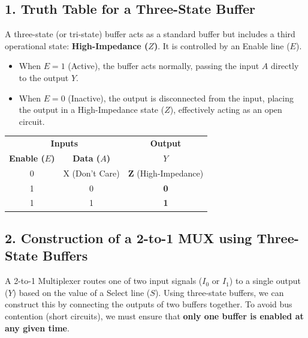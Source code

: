 \documentclass[12pt,a3paper]{article}
\begin{document}
\begin{enumerate}
\begin{tcolorbox}[enhanced,breakable,ansbox,colback=cD!4,colframe=cD,boxrule=0.8pt,arc=5pt,title={\textbf{Answer}},fonttitle=\bfseries\color{white},colbacktitle=cD]

\subsection*{1. Truth Table for a Three-State Buffer}
A three-state (or tri-state) buffer acts as a standard buffer but includes a third operational state: \textbf{High-Impedance ($Z$)}. It is controlled by an Enable line ($E$). 
\begin{itemize}
    \item When $E = 1$ (Active), the buffer acts normally, passing the input $A$ directly to the output $Y$.
    \item When $E = 0$ (Inactive), the output is disconnected from the input, placing the output in a High-Impedance state ($Z$), effectively acting as an open circuit.
\end{itemize}

\begin{center}
\renewcommand{\arraystretch}{1.3}
\begin{tabular}{cc | c}
\toprule
\multicolumn{2}{c|}{\textbf{Inputs}} & \textbf{Output} \\
\textbf{Enable ($E$)} & \textbf{Data ($A$)} & \textbf{$Y$} \\
\midrule
0 & X (Don't Care) & \textcolor{cD}{\textbf{Z}} (High-Impedance) \\
1 & 0 & \textbf{0} \\
1 & 1 & \textbf{1} \\
\bottomrule
\end{tabular}
\end{center}

\vspace{0.4cm}
\subsection*{2. Construction of a 2-to-1 MUX using Three-State Buffers}

A 2-to-1 Multiplexer routes one of two input signals ($I_0$ or $I_1$) to a single output ($Y$) based on the value of a Select line ($S$).
Using three-state buffers, we can construct this by connecting the outputs of two buffers together. To avoid bus contention (short circuits), we must ensure that \textbf{only one buffer is enabled at any given time}.


\end{tcolorbox}
\end{enumerate}
\end{document}
